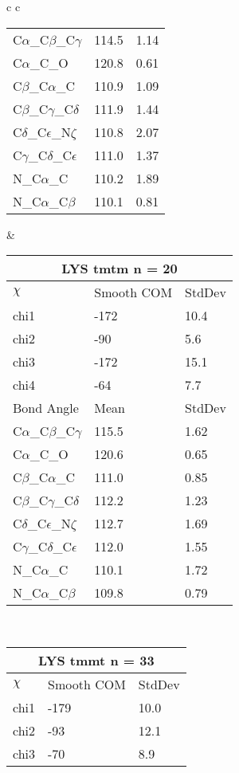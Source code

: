 \begin{longtable}{ c c }
\begin{tabular}{ l l l }
  C$\alpha$\_C$\beta$\_C$\gamma$ & 114.5 & 1.14\\
  C$\alpha$\_C\_O & 120.8 & 0.61\\
  C$\beta$\_C$\alpha$\_C & 110.9 & 1.09\\
  C$\beta$\_C$\gamma$\_C$\delta$ & 111.9 & 1.44\\
  C$\delta$\_C$\epsilon$\_N$\zeta$ & 110.8 & 2.07\\
  C$\gamma$\_C$\delta$\_C$\epsilon$ & 111.0 & 1.37\\
  N\_C$\alpha$\_C & 110.2 & 1.89\\
  N\_C$\alpha$\_C$\beta$ & 110.1 & 0.81\\
  \bottomrule
  \end{tabular}
  &
  \begin{tabular}{ l l l }
  \toprule
  \multicolumn{3}{c}{LYS \textbf{tmtm} n = 20} \\ \toprule
  $\chi$       & Smooth COM & StdDev \\ \midrule
  chi1 & -172 & 10.4 \\ 
  chi2 & -90 & 5.6 \\ 
  chi3 & -172 & 15.1 \\ 
  chi4 & -64 & 7.7 \\ \midrule
  Bond Angle   & Mean     & StdDev \\ \midrule
  C$\alpha$\_C$\beta$\_C$\gamma$ & 115.5 & 1.62\\
  C$\alpha$\_C\_O & 120.6 & 0.65\\
  C$\beta$\_C$\alpha$\_C & 111.0 & 0.85\\
  C$\beta$\_C$\gamma$\_C$\delta$ & 112.2 & 1.23\\
  C$\delta$\_C$\epsilon$\_N$\zeta$ & 112.7 & 1.69\\
  C$\gamma$\_C$\delta$\_C$\epsilon$ & 112.0 & 1.55\\
  N\_C$\alpha$\_C & 110.1 & 1.72\\
  N\_C$\alpha$\_C$\beta$ & 109.8 & 0.79\\
  \bottomrule
  \end{tabular}
  \\
  \begin{tabular}{ l l l }
  \toprule
  \multicolumn{3}{c}{LYS \textbf{tmmt} n = 33} \\ \toprule
  $\chi$       & Smooth COM & StdDev \\ \midrule
  chi1 & -179 & 10.0 \\ 
  chi2 & -93 & 12.1 \\ 
  chi3 & -70 & 8.9 \\ 

\end{tabular}
\end{longtable}
